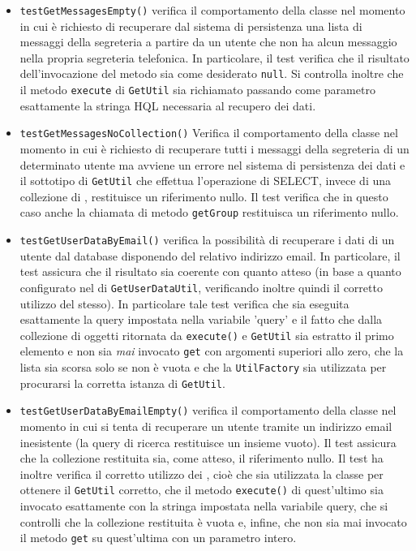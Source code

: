 \begin{itemize}
\begin{itemize}
\item \texttt{testGetMessagesEmpty()} verifica il comportamento della classe nel momento in cui è richiesto di recuperare dal sistema di persistenza una lista di messaggi della segreteria a partire da un utente che non ha alcun messaggio nella propria segreteria telefonica. In particolare, il test verifica che il risultato dell'invocazione del metodo sia come desiderato \texttt{null}.
Si controlla inoltre che il metodo \texttt{execute} di \texttt{GetUtil} sia richiamato passando come parametro esattamente la stringa HQL necessaria al recupero dei dati.

\item \texttt{testGetMessagesNoCollection()} Verifica il comportamento della classe nel momento in cui è richiesto di recuperare tutti i messaggi della segreteria di un determinato utente ma avviene un errore nel sistema di persistenza dei dati e il sottotipo di \texttt{GetUtil} che effettua l'operazione di SELECT, invece di una collezione di , restituisce un riferimento nullo. Il test verifica che in questo caso anche la chiamata di metodo \texttt{getGroup} restituisca un riferimento nullo.

\item \texttt{testGetUserDataByEmail()} verifica la possibilità di recuperare i dati di un utente dal database disponendo del relativo indirizzo email. In particolare, il test assicura che il risultato sia coerente con quanto atteso (in base a quanto configurato nel \underline{} di \texttt{GetUserDataUtil}, verificando inoltre quindi il corretto utilizzo del  stesso). In particolare tale test verifica che sia eseguita esattamente la query impostata nella variabile 'query' e il fatto che dalla collezione di oggetti ritornata da \texttt{execute()} e \texttt{GetUtil} sia estratto il primo elemento e non sia \textit{mai} invocato \texttt{get} con argomenti superiori allo zero, che la lista sia scorsa solo se non è vuota e che la \texttt{UtilFactory} sia utilizzata per procurarsi la corretta istanza di \texttt{GetUtil}.

\item \texttt{testGetUserDataByEmailEmpty()} verifica il comportamento della classe nel momento in cui si tenta di recuperare un utente tramite un indirizzo email inesistente (la query di ricerca restituisce un insieme vuoto). Il test assicura che la collezione restituita sia, come atteso, il riferimento nullo. Il test ha inoltre verifica il corretto utilizzo dei , cioè che sia utilizzata la classe  per ottenere il \texttt{GetUtil} corretto, che il metodo \texttt{execute()} di quest'ultimo sia invocato esattamente con la stringa impostata nella variabile query, che si controlli che la collezione restituita è vuota e, infine, che non sia mai invocato il metodo \texttt{get} su quest'ultima con un parametro intero.


\end{itemize}
\end{itemize}

